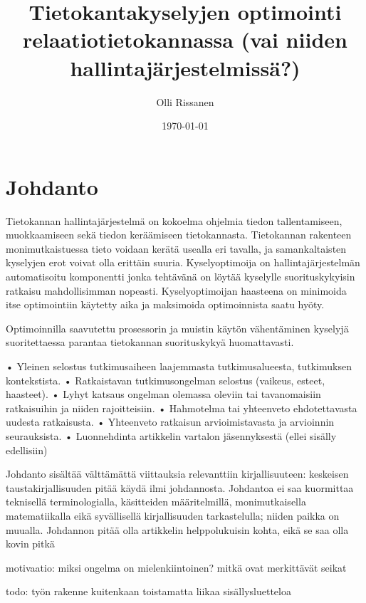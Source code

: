 \documentclass[finnish]{tktltiki2}
\title{Tietokantakyselyjen optimointi relaatiotietokannassa (vai niiden hallintajärjestelmissä?)}
\author{Olli Rissanen}
\date{\today}
\theoremstyle{definition}
\theoremstyle{remark}
\begin{document}

\maketitle        %
\makeabstract     %

\tableofcontents  %
\newpage          %



\section{Johdanto}

Tietokannan hallintajärjestelmä on kokoelma ohjelmia tiedon tallentamiseen, muokkaamiseen sekä tiedon keräämiseen tietokannasta. Tietokannan rakenteen monimutkaistuessa tieto voidaan kerätä usealla eri tavalla, ja samankaltaisten kyselyjen erot voivat olla erittäin suuria. Kyselyoptimoija on hallintajärjestelmän automatisoitu komponentti jonka tehtävänä on löytää kyselylle suorituskykyisin ratkaisu mahdollisimman nopeasti. Kyselyoptimoijan haasteena on minimoida itse optimointiin käytetty aika ja maksimoida optimoinnista saatu hyöty.

Optimoinnilla saavutettu prosessorin ja muistin käytön vähentäminen kyselyjä suoritettaessa parantaa tietokannan suorituskykyä huomattavasti. 

• Yleinen selostus tutkimusaiheen laajemmasta tutkimusalueesta,
tutkimuksen kontekstista.
• Ratkaistavan tutkimusongelman selostus (vaikeus, esteet, haasteet).
• Lyhyt katsaus ongelman olemassa oleviin tai tavanomaisiin ratkaisuihin ja niiden rajoitteisiin.
• Hahmotelma tai yhteenveto ehdotettavasta uudesta ratkaisusta.
• Yhteenveto ratkaisun arvioimistavasta ja arvioinnin seurauksista.
• Luonnehdinta artikkelin vartalon jäsennyksestä (ellei sisälly edellisiin)

Johdanto sisältää välttämättä viittauksia relevanttiin kirjallisuuteen:
keskeisen taustakirjallisuuden pitää käydä ilmi johdannosta.
Johdantoa ei saa kuormittaa teknisellä terminologialla, käsitteiden määritelmillä, monimutkaisella matematiikalla eikä syvällisellä kirjallisuuden
tarkastelulla; niiden paikka on muualla.
Johdannon pitää olla artikkelin helppolukuisin kohta, eikä se saa olla
kovin pitkä

motivaatio: miksi ongelma on mielenkiintoinen? mitkä ovat merkittävät seikat

todo: työn rakenne kuitenkaan toistamatta liikaa sisällysluetteloa
\end{document}
